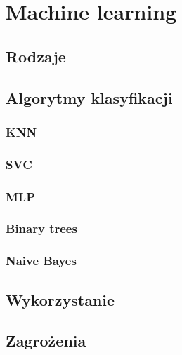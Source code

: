 \chapter{Machine learning}
\section{Rodzaje}
\section{Algorytmy klasyfikacji}
\subsection{KNN}
\subsection{SVC}
\subsection{MLP}
\subsection{Binary trees}
\subsection{Naive Bayes}
\section{Wykorzystanie}
\section{Zagrożenia}


